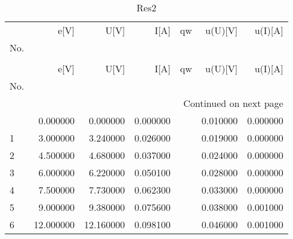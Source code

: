 \begin{longtable}[H]{lrrrlrr}
\caption{Res2} \label{tab:Res2} \\
\toprule
 & e[V] & U[V] & I[A] & qw & u(U)[V] & u(I)[A] \\
No. &  &  &  &  &  &  \\
\midrule
\endfirsthead
\caption[]{Res2} \\
\toprule
 & e[V] & U[V] & I[A] & qw & u(U)[V] & u(I)[A] \\
No. &  &  &  &  &  &  \\
\midrule
\endhead
\midrule
\multicolumn{7}{r}{Continued on next page} \\
\midrule
\endfoot
\bottomrule
\endlastfoot
0 & 0.000000 & 0.000000 & 0.000000 &  & 0.010000 & 0.000000 \\
1 & 3.000000 & 3.240000 & 0.026000 &  & 0.019000 & 0.000000 \\
2 & 4.500000 & 4.680000 & 0.037000 &  & 0.024000 & 0.000000 \\
3 & 6.000000 & 6.220000 & 0.050100 &  & 0.028000 & 0.000000 \\
4 & 7.500000 & 7.730000 & 0.062300 &  & 0.033000 & 0.000000 \\
5 & 9.000000 & 9.380000 & 0.075600 &  & 0.038000 & 0.001000 \\
6 & 12.000000 & 12.160000 & 0.098100 &  & 0.046000 & 0.001000 \\
\end{longtable}
